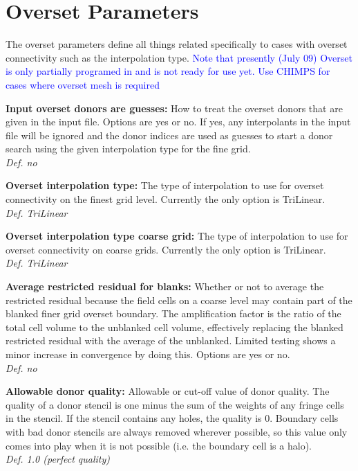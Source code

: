 \documentclass[12pt,epsf,colordvi]{article}
\begin{document}
\section{Overset Parameters}
% 
The overset parameters define all things related specifically to cases with overset connectivity such as the interpolation type. \textcolor{blue}{Note that presently (July 09) Overset is only partially programed in and is not ready for use yet. Use CHIMPS for cases where overset mesh is required}
\begin{description}
% 
	\item{\bf  Input overset donors are guesses:} How to treat the overset donors that are given in the input file. Options are yes or no. If yes, any interpolants in the input file will be ignored and the donor indices are used as guesses to start a donor search using the given interpolation type for the fine grid. \\
{\it Def.  no }
%
 	\item{\bf Overset interpolation type: } The type of interpolation to use for overset connectivity on the finest grid level. Currently the only option is TriLinear. \\
{\it Def.  TriLinear}
%
 	\item{\bf Overset interpolation type coarse grid: } The type of interpolation to use for overset connectivity on coarse grids. Currently the only option is TriLinear. \\
{\it Def.  TriLinear}
%
 	\item{\bf Average restricted residual for blanks: }Whether or not to average the restricted residual because the field cells on a coarse level may contain part of the blanked finer grid overset boundary. The amplification factor is the ratio of the total cell volume to the unblanked cell volume, effectively replacing the blanked restricted residual with the average of the unblanked. Limited testing shows a minor increase in convergence by doing this. Options are yes or no. \\
{\it Def. no}
%
 	\item{\bf Allowable donor quality:} Allowable or cut-off value of donor quality. The quality of a donor stencil is one minus the sum of the weights of any fringe cells in the stencil. If the stencil contains any holes, the quality is 0. Boundary cells with bad donor stencils are always removed wherever possible, so this value only comes into play when it is not possible (i.e. the boundary cell is a halo). \\
{\it Def.  1.0 (perfect quality)}
%
\end{description}
%
\noindent 
\end{document}
